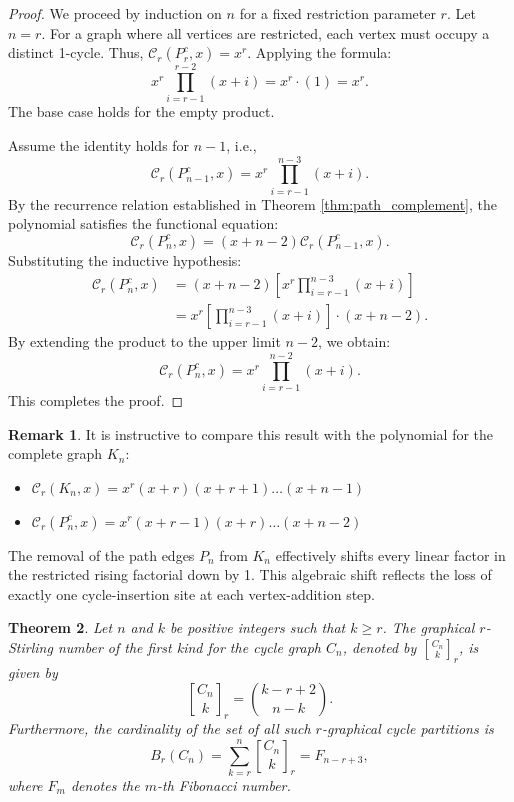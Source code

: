 \documentclass{amsart}
\newcommand{\cyc}{\mathcal{C}}
\newtheorem{theorem}{Theorem}[section]
\theoremstyle{definition}
\newtheorem{remark}[theorem]{Remark}
\begin{document}
\begin{proof}
We proceed by induction on $n$ for a fixed restriction parameter $r$.
 Let $n = r$. For a graph where all vertices are restricted, each vertex must occupy a distinct 1-cycle. Thus, $\cyc_r(P_r^c, x) = x^r$. Applying the formula: 
\[ x^r \prod_{i=r-1}^{r-2} (x + i) = x^r \cdot (1) = x^r. \]
The base case holds for the empty product.

Assume the identity holds for $n-1$, i.e.,
\[ \cyc_r(P_{n-1}^c, x) = x^r \prod_{i=r-1}^{n-3} (x + i). \]
By the recurrence relation established in Theorem \ref{thm:path_complement}, the polynomial satisfies the functional equation:
\begin{equation*}
    \cyc_r(P_n^c, x) = (x + n - 2) \cyc_r(P_{n-1}^c, x).
\end{equation*}
Substituting the inductive hypothesis:
\begin{align*}
    \cyc_r(P_n^c, x) &= (x + n - 2) \left[ x^r \prod_{i=r-1}^{n-3} (x + i) \right] \\
    &= x^r \left[ \prod_{i=r-1}^{n-3} (x + i) \right] \cdot (x + n - 2).
\end{align*}
By extending the product to the upper limit $n-2$, we obtain:
\begin{equation*}
    \cyc_r(P_n^c, x) = x^r \prod_{i=r-1}^{n-2} (x + i).
\end{equation*}
This completes the proof.
\end{proof}



\begin{remark}
It is instructive to compare this result with the polynomial for the complete graph $K_n$:
\begin{itemize}
    \item $\cyc_r(K_n, x) = x^r (x+r)(x+r+1)\dots(x+n-1)$
    \item $\cyc_r(P_n^c, x) = x^r (x+r-1)(x+r)\dots(x+n-2)$
\end{itemize}
The removal of the path edges $P_n$ from $K_n$ effectively shifts every linear factor in the restricted rising factorial down by 1. This algebraic shift reflects the loss of exactly one cycle-insertion site at each vertex-addition step.
\end{remark}



\begin{theorem}\label{thm:cycle_stirling}
Let $n$ and $k$ be positive integers such that $k \geq r$. The graphical $r$-Stirling number of the first kind for the cycle graph $C_n$, denoted by ${C_n \brack k}_r$, is given by
\begin{equation*}
    {C_n \brack k}_r = \binom{k-r+2}{n-k}.
\end{equation*}
Furthermore, the cardinality of the set of all such $r$-graphical cycle partitions is 
\begin{equation*}
   B_r(C_n)=\sum_{k=r}^n {C_n \brack k}_r = F_{n-r+3},
\end{equation*}
where $F_m$ denotes the $m$-th Fibonacci number.
\end{theorem}
\end{document}
